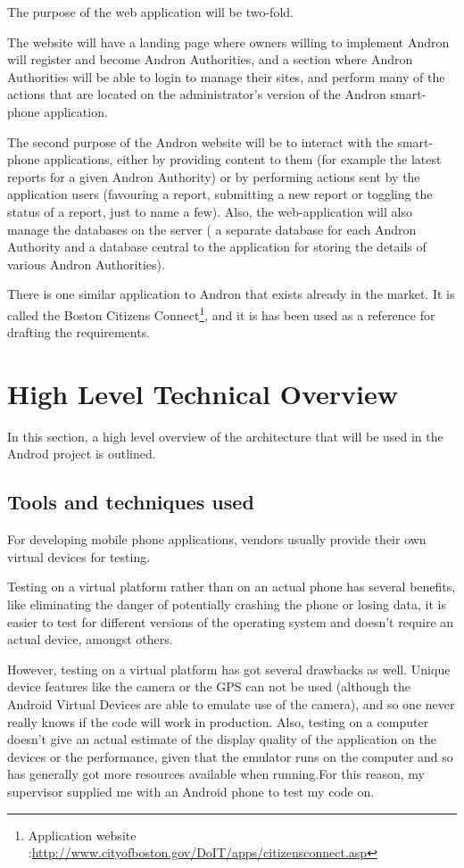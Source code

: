 \documentclass[12pt]{ecsproject}     %
\begin{document}
The purpose of the web application will be two-fold. 

The website will have a landing page where owners willing to implement Andron will register and become Andron Authorities, and a section where Andron Authorities will be able to login to manage their sites, and perform many of the actions that are located on the administrator's version of the Andron smart-phone application.

The second purpose of the Andron website will be to interact with the smart-phone applications, either by providing content to them (for example the latest reports for a given Andron Authority) or by performing actions sent by the application users (favouring a report, submitting a new report or toggling the status of a report, just to name a few). Also, the web-application will also manage the databases on the server ( a separate database for each Andron Authority and a database central to the application for storing the details of various Andron Authorities).

There is one similar application to Andron that exists already in the market. It is called the Boston Citizens Connect\footnote{Application website :\hyperlink{http://www.cityofboston.gov/DoIT/apps/citizensconnect.asp}{http://www.cityofboston.gov/DoIT/apps/citizensconnect.asp}}, and it is has been used as a reference for drafting the requirements.

\pagebreak
\section{High Level Technical Overview}
In this section, a high level overview of the architecture that will be used in the Androd project is outlined.

\subsection{Tools and techniques used}
For developing mobile phone applications, vendors usually provide their own virtual devices for testing. 

Testing on a virtual platform rather than on an actual phone has several benefits, like eliminating the danger of potentially crashing the phone or losing data, it is easier to test for different versions of the operating system and doesn't require an actual device, amongst others.

However, testing on a virtual platform has got several drawbacks as well. Unique device features like the camera or the GPS can not be used (although the Android Virtual Devices are able to emulate use of the camera), and so one never really knows if the code will work in production. Also, testing on a computer doesn't give an actual estimate of the display quality of the application on the devices or the performance, given that the emulator runs on the computer and so has generally got more resources available when running.For this reason, my supervisor supplied me with an Android phone to test my code on. 
\end{document}
